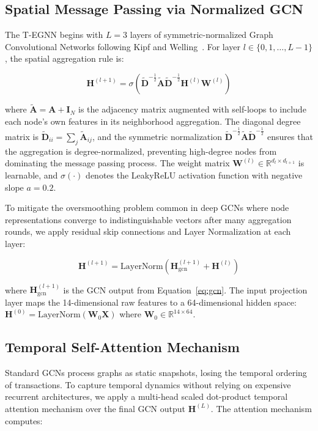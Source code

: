 \documentclass[conference]{IEEEtran}
\begin{document}
\subsection{Spatial Message Passing via Normalized GCN}
The T-EGNN begins with $L=3$ layers of symmetric-normalized Graph Convolutional Networks following Kipf and Welling~\cite{kipf2017gcn}. For layer $l \in \{0, 1, \dots, L-1\}$, the spatial aggregation rule is:

\begin{equation}
\mathbf{H}^{(l+1)} = \sigma\left(\tilde{\mathbf{D}}^{-\frac{1}{2}} \tilde{\mathbf{A}} \tilde{\mathbf{D}}^{-\frac{1}{2}} \mathbf{H}^{(l)} \mathbf{W}^{(l)}\right)
\label{eq:gcn}
\end{equation}

where $\tilde{\mathbf{A}} = \mathbf{A} + \mathbf{I}_N$ is the adjacency matrix augmented with self-loops to include each node's own features in its neighborhood aggregation. The diagonal degree matrix is $\tilde{\mathbf{D}}_{ii} = \sum_j \tilde{\mathbf{A}}_{ij}$, and the symmetric normalization $\tilde{\mathbf{D}}^{-\frac{1}{2}} \tilde{\mathbf{A}} \tilde{\mathbf{D}}^{-\frac{1}{2}}$ ensures that the aggregation is degree-normalized, preventing high-degree nodes from dominating the message passing process. The weight matrix $\mathbf{W}^{(l)} \in \mathbb{R}^{d_l \times d_{l+1}}$ is learnable, and $\sigma(\cdot)$ denotes the LeakyReLU activation function with negative slope $a=0.2$.

To mitigate the oversmoothing problem common in deep GCNs where node representations converge to indistinguishable vectors after many aggregation rounds, we apply residual skip connections and Layer Normalization at each layer:

\begin{equation}
\mathbf{H}^{(l+1)} = \text{LayerNorm}\left(\mathbf{H}^{(l+1)}_{\text{gcn}} + \mathbf{H}^{(l)}\right)
\label{eq:residual}
\end{equation}

where $\mathbf{H}^{(l+1)}_{\text{gcn}}$ is the GCN output from Equation~\ref{eq:gcn}. The input projection layer maps the 14-dimensional raw features to a 64-dimensional hidden space: $\mathbf{H}^{(0)} = \text{LayerNorm}(\mathbf{W}_0 \mathbf{X})$ where $\mathbf{W}_0 \in \mathbb{R}^{14 \times 64}$.

\subsection{Temporal Self-Attention Mechanism}
Standard GCNs process graphs as static snapshots, losing the temporal ordering of transactions. To capture temporal dynamics without relying on expensive recurrent architectures, we apply a multi-head scaled dot-product temporal attention mechanism over the final GCN output $\mathbf{H}^{(L)}$. The attention mechanism computes:
\end{document}
